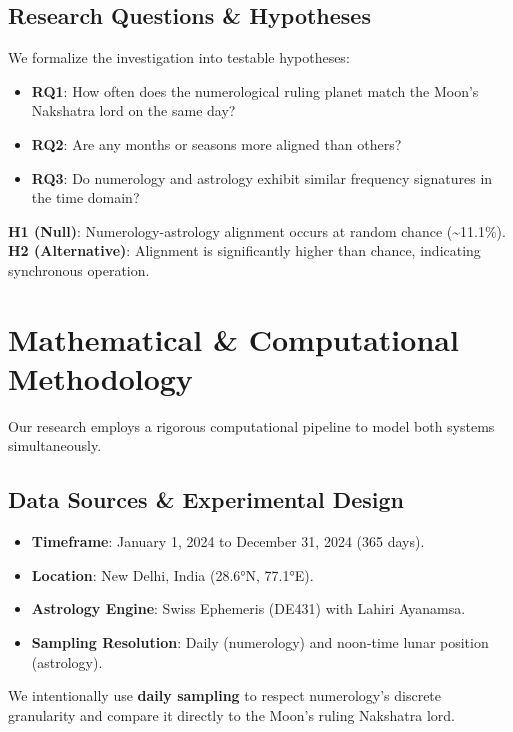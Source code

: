 \documentclass[
  11pt,
  a4paper,
  oneside,
  openany]{report}
\providecommand{\tightlist}{%
  \setlength{\itemsep}{0pt}\setlength{\parskip}{0pt}}\usepackage{longtable,booktabs,array}
\begin{document}
\section{Research Questions \&
Hypotheses}\label{research-questions-hypotheses}

We formalize the investigation into testable hypotheses:

\begin{itemize}
\tightlist
\item
  \textbf{RQ1}: How often does the numerological ruling planet match the
  Moon's Nakshatra lord on the same day?
\item
  \textbf{RQ2}: Are any months or seasons more aligned than others?
\item
  \textbf{RQ3}: Do numerology and astrology exhibit similar frequency
  signatures in the time domain?
\end{itemize}

\textbf{H1 (Null)}: Numerology-astrology alignment occurs at random
chance (\textasciitilde11.1\%). \textbf{H2 (Alternative)}: Alignment is
significantly higher than chance, indicating synchronous operation.

\chapter{Mathematical \& Computational
Methodology}\label{mathematical-computational-methodology}

Our research employs a rigorous computational pipeline to model both
systems simultaneously.

\section{Data Sources \& Experimental
Design}\label{data-sources-experimental-design}

\begin{itemize}
\tightlist
\item
  \textbf{Timeframe}: January 1, 2024 to December 31, 2024 (365 days).
\item
  \textbf{Location}: New Delhi, India (28.6°N, 77.1°E).
\item
  \textbf{Astrology Engine}: Swiss Ephemeris (DE431) with Lahiri
  Ayanamsa.
\item
  \textbf{Sampling Resolution}: Daily (numerology) and noon-time lunar
  position (astrology).
\end{itemize}

We intentionally use \textbf{daily sampling} to respect numerology's
discrete granularity and compare it directly to the Moon's ruling
Nakshatra lord.
\end{document}

